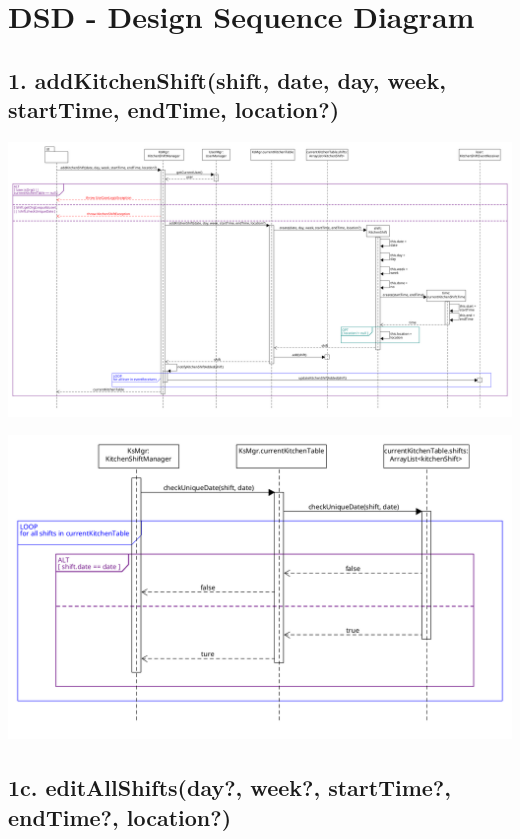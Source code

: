\chapter{DSD - Design Sequence Diagram}

\section*{1. addKitchenShift(shift, date, day, week, startTime, endTime, location?)}

\begin{center}
  \includegraphics[scale = 0.2]{images/DSD/Esame DSD 1.png}
\end{center}

\begin{center}
  \includegraphics[scale = 0.4]{images/DSD/Esame DSD 1 Extra.png}  
\end{center}


\pagebreak

\section*{1c. editAllShifts(day?, week?, startTime?, endTime?, location?)}

